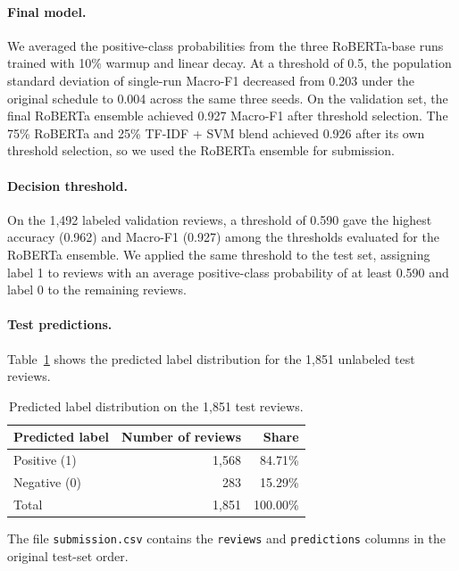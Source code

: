 \paragraph{Final model.}
We averaged the positive-class probabilities from the three
RoBERTa-base runs trained with 10\% warmup and linear decay. At a
threshold of 0.5, the population standard deviation of single-run
Macro-F1 decreased from 0.203 under the original
schedule to 0.004 across the same three seeds. On the
validation set, the final RoBERTa ensemble achieved 0.927 Macro-F1
after threshold selection. The 75\% RoBERTa and 25\% TF-IDF + SVM
blend achieved 0.926 after its own threshold selection, so we used
the RoBERTa ensemble for submission.

\paragraph{Decision threshold.}
On the 1,492 labeled validation reviews, a threshold of 0.590 gave
the highest accuracy (0.962) and Macro-F1 (0.927) among the
thresholds evaluated for the RoBERTa ensemble. We applied the same
threshold to the test set, assigning label 1 to reviews with an
average positive-class probability of at least 0.590 and label 0
to the remaining reviews.

\paragraph{Test predictions.}
Table~\ref{tab:e-dist} shows the predicted label distribution for the 1,851 unlabeled test reviews.

\begin{table}[!htb]
\centering
\caption{Predicted label distribution on the 1{,}851 test reviews.}
\label{tab:e-dist}
\small
\begin{tabular}{lrr}
\toprule
Predicted label & Number of reviews & Share \\
\midrule
Positive (1) & 1{,}568 & 84.71\% \\
Negative (0) & 283 & 15.29\% \\
\midrule
Total & 1{,}851 & 100.00\% \\
\bottomrule
\end{tabular}
\end{table}

The file \texttt{submission.csv} contains the \texttt{reviews}
and \texttt{predictions} columns in the original test-set order.